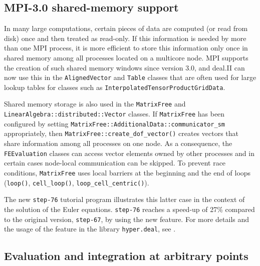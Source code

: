 \documentclass{ansarticle-preprint}
\begin{document}
\subsection{MPI-3.0 shared-memory support}\label{subsec:sm}
In many large computations, certain pieces of data are computed
(or read from disk) once and then treated as read-only. If this information is needed by more
than one MPI process, it is more efficient to store this information only
once in shared memory among all processes located on a multicore
node. MPI supports the creation of such shared memory windows since
version 3.0, and deal.II can now use this in the
\texttt{AlignedVector} and \texttt{Table} classes that are often used
for large lookup tables for classes such as \texttt{InterpolatedTensorProductGridData}.

Shared memory storage is also used in the \texttt{MatrixFree} and
\texttt{LinearAlgebra::\allowbreak distributed::\allowbreak Vector} classes. If \texttt{MatrixFree} has been configured by setting
\texttt{MatrixFree::\allowbreak AdditionalData::\allowbreak communicator\_sm} appropriately, then
\texttt{MatrixFree::create\_dof\_vector()} creates vectors that share
information among all processes on one node. As a consequence, the
\texttt{FEEvaluation} classes can access vector elements owned by
other processes and in certain cases node-local
communication can be skipped. To prevent race conditions, \texttt{MatrixFree} uses local
barriers at the beginning and the end of loops (\texttt{loop()}, \texttt{cell\_loop()}, \texttt{loop\_cell\_centric()}).

The new \texttt{step-76} tutorial program illustrates this latter case
in the context of the solution of the Euler equations. \texttt{step-76} reaches a
speed-up of 27\% compared to the
original version, \texttt{step-67}, by using the new feature.
For more details and the usage of the feature in the library \texttt{hyper.deal}, see \citep{munch2020hyperdeal}.



\subsection{Evaluation and integration at arbitrary points}
\label{subsec:fepointvalues}
\end{document}
